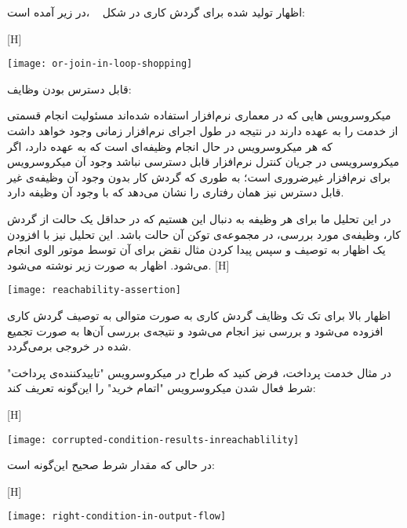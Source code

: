 اظهار تولید شده برای گردش کاری در شکل ~ ،در زیر آمده است:



[H]
\raggedright
\texttt{[image: or-join-in-loop-shopping]}
\vspace{0.5em}


 قابل دسترس بودن وظایف:

میکروسرویس هایی که در معماری نرم‌افزار استفاده شده‌اند مسئولیت انجام قسمتی از خدمت را به عهده دارند در نتیجه در طول اجرای نرم‌افزار زمانی وجود خواهد داشت که هر میکروسرویس در حال انجام وظیفه‌ای است که به عهده دارد، اگر میکروسرویسی در جریان کنترل نرم‌افزار قابل دسترسی نباشد وجود آن میکروسرویس برای نرم‌افزار غیرضروری است؛ به طوری که گردش کار بدون وجود آن وظیفه‌‌ی غیر قابل دسترس نیز همان رفتاری را نشان می‌دهد که با وجود آن وظیفه دارد.

در این تحلیل ما برای هر وظیفه به دنبال این هستیم که در حداقل یک حالت‌ از گردش کار، وظیفه‌ی مورد بررسی، در مجموعه‌ی توکن آن حالت باشد. این تحلیل نیز با افزودن یک اظهار به توصیف و سپس پیدا کردن مثال نقض برای آن توسط موتور الوی انجام‌ می‌شود. اظهار به صورت زیر نوشته می‌شود. 
[H]
\raggedright
\texttt{[image: reachability-assertion]}
\vspace{0.5em}

اظهار بالا برای تک تک وظایف گردش کاری به صورت متوالی به توصیف گردش کاری افزوده می‌شود و بررسی نیز انجام می‌شود و نتیجه‌ی بررسی آن‌ها به صورت تجمیع شده در خروجی برمی‌گردد.

در مثال خدمت پرداخت، فرض کنید که طراح در میکروسرویس "تاییدکننده‌ی پرداخت" شرط فعال شدن میکروسرویس "اتمام خرید" را این‌گونه تعریف کند:


[H]
\raggedright
\texttt{[image: corrupted-condition-results-inreachablility]}
\vspace{0.5em}

در حالی که مقدار شرط صحیح این‌گونه است:



[H]
\raggedright
\texttt{[image: right-condition-in-output-flow]}
\vspace{0.5em}



